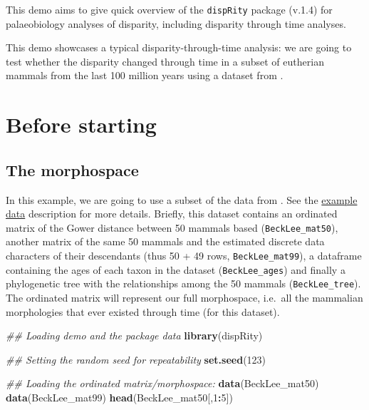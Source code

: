\documentclass[]{book}
\newenvironment{Shaded}{\begin{snugshade}}{\end{snugshade}}
\newcommand{\CommentTok}[1]{\textcolor[rgb]{0.56,0.35,0.01}{\textit{#1}}}
\newcommand{\DecValTok}[1]{\textcolor[rgb]{0.00,0.00,0.81}{#1}}
\newcommand{\KeywordTok}[1]{\textcolor[rgb]{0.13,0.29,0.53}{\textbf{#1}}}
\newcommand{\NormalTok}[1]{#1}
\newcommand{\OperatorTok}[1]{\textcolor[rgb]{0.81,0.36,0.00}{\textbf{#1}}}
\begin{document}
This demo aims to give quick overview of the \texttt{dispRity} package (v.1.4) for palaeobiology analyses of disparity, including disparity through time analyses.

This demo showcases a typical disparity-through-time analysis: we are going to test whether the disparity changed through time in a subset of eutherian mammals from the last 100 million years using a dataset from \citet{beckancient2014}.

\hypertarget{before-starting}{%
\section{Before starting}\label{before-starting}}

\hypertarget{the-morphospace}{%
\subsection{The morphospace}\label{the-morphospace}}

In this example, we are going to use a subset of the data from \citet{beckancient2014}.
See the \protect\hyperlink{example-data}{example data} description for more details.
Briefly, this dataset contains an ordinated matrix of the Gower distance between 50 mammals based (\texttt{BeckLee\_mat50}), another matrix of the same 50 mammals and the estimated discrete data characters of their descendants (thus 50 + 49 rows, \texttt{BeckLee\_mat99}), a dataframe containing the ages of each taxon in the dataset (\texttt{BeckLee\_ages}) and finally a phylogenetic tree with the relationships among the 50 mammals (\texttt{BeckLee\_tree}).
The ordinated matrix will represent our full morphospace, i.e.~all the mammalian morphologies that ever existed through time (for this dataset).

\begin{Shaded}
\begin{Highlighting}[]
\CommentTok{## Loading demo and the package data}
\KeywordTok{library}\NormalTok{(dispRity)}

\CommentTok{## Setting the random seed for repeatability}
\KeywordTok{set.seed}\NormalTok{(}\DecValTok{123}\NormalTok{)}

\CommentTok{## Loading the ordinated matrix/morphospace:}
\KeywordTok{data}\NormalTok{(BeckLee_mat50)}
\KeywordTok{data}\NormalTok{(BeckLee_mat99)}
\KeywordTok{head}\NormalTok{(BeckLee_mat50[,}\DecValTok{1}\OperatorTok{:}\DecValTok{5}\NormalTok{])}
\end{Highlighting}
\end{Shaded}
\end{document}
